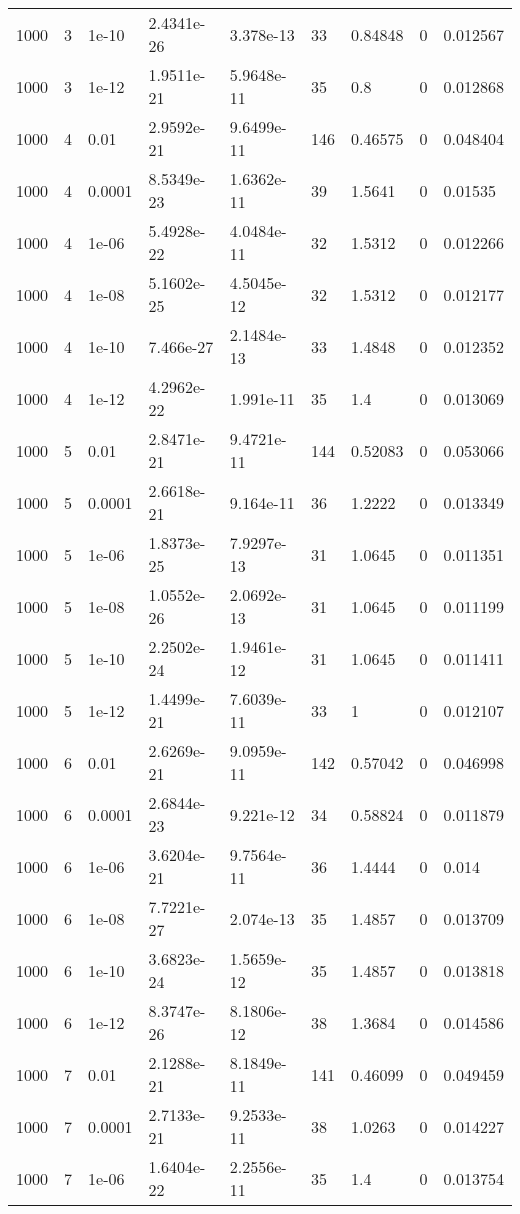 \begin{tabular}{lllllllll}
1000 & 3 & 1e-10 & 2.4341e-26 & 3.378e-13 & 33 & 0.84848 & 0 & 0.012567 \\ 
1000 & 3 & 1e-12 & 1.9511e-21 & 5.9648e-11 & 35 & 0.8 & 0 & 0.012868 \\ 
1000 & 4 & 0.01 & 2.9592e-21 & 9.6499e-11 & 146 & 0.46575 & 0 & 0.048404 \\ 
1000 & 4 & 0.0001 & 8.5349e-23 & 1.6362e-11 & 39 & 1.5641 & 0 & 0.01535 \\ 
1000 & 4 & 1e-06 & 5.4928e-22 & 4.0484e-11 & 32 & 1.5312 & 0 & 0.012266 \\ 
1000 & 4 & 1e-08 & 5.1602e-25 & 4.5045e-12 & 32 & 1.5312 & 0 & 0.012177 \\ 
1000 & 4 & 1e-10 & 7.466e-27 & 2.1484e-13 & 33 & 1.4848 & 0 & 0.012352 \\ 
1000 & 4 & 1e-12 & 4.2962e-22 & 1.991e-11 & 35 & 1.4 & 0 & 0.013069 \\ 
1000 & 5 & 0.01 & 2.8471e-21 & 9.4721e-11 & 144 & 0.52083 & 0 & 0.053066 \\ 
1000 & 5 & 0.0001 & 2.6618e-21 & 9.164e-11 & 36 & 1.2222 & 0 & 0.013349 \\ 
1000 & 5 & 1e-06 & 1.8373e-25 & 7.9297e-13 & 31 & 1.0645 & 0 & 0.011351 \\ 
1000 & 5 & 1e-08 & 1.0552e-26 & 2.0692e-13 & 31 & 1.0645 & 0 & 0.011199 \\ 
1000 & 5 & 1e-10 & 2.2502e-24 & 1.9461e-12 & 31 & 1.0645 & 0 & 0.011411 \\ 
1000 & 5 & 1e-12 & 1.4499e-21 & 7.6039e-11 & 33 & 1 & 0 & 0.012107 \\ 
1000 & 6 & 0.01 & 2.6269e-21 & 9.0959e-11 & 142 & 0.57042 & 0 & 0.046998 \\ 
1000 & 6 & 0.0001 & 2.6844e-23 & 9.221e-12 & 34 & 0.58824 & 0 & 0.011879 \\ 
1000 & 6 & 1e-06 & 3.6204e-21 & 9.7564e-11 & 36 & 1.4444 & 0 & 0.014 \\ 
1000 & 6 & 1e-08 & 7.7221e-27 & 2.074e-13 & 35 & 1.4857 & 0 & 0.013709 \\ 
1000 & 6 & 1e-10 & 3.6823e-24 & 1.5659e-12 & 35 & 1.4857 & 0 & 0.013818 \\ 
1000 & 6 & 1e-12 & 8.3747e-26 & 8.1806e-12 & 38 & 1.3684 & 0 & 0.014586 \\ 
1000 & 7 & 0.01 & 2.1288e-21 & 8.1849e-11 & 141 & 0.46099 & 0 & 0.049459 \\ 
1000 & 7 & 0.0001 & 2.7133e-21 & 9.2533e-11 & 38 & 1.0263 & 0 & 0.014227 \\ 
1000 & 7 & 1e-06 & 1.6404e-22 & 2.2556e-11 & 35 & 1.4 & 0 & 0.013754 \\ 

\end{tabular}

